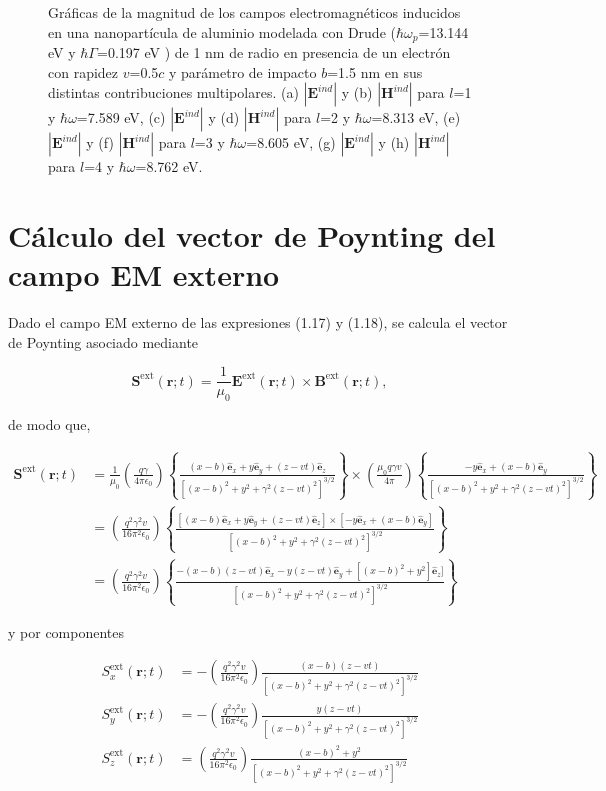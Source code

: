 \documentclass[a4paper,10pt]{article}
\newcommand{\hatbf}[1] {\hat{\mathbf{#1}}}	%
\begin{document}
\begin{figure}[htb!]
\begin{subfigure}[b]{0.5\textwidth}
\caption{}
\end{subfigure}
\caption{Gráficas de la magnitud de los campos electromagnéticos inducidos en una nanopartícula de aluminio modelada con Drude ($\hbar\omega_p$=13.144 eV y $\hbar\Gamma$=0.197 eV ) de 1 nm de radio en presencia de un electrón con rapidez $v$=0.5$c$ y parámetro de impacto $b$=1.5 nm en sus distintas contribuciones multipolares. (a) $|\textbf{E}^{ind}|$ y (b) $|\textbf{H}^{ind}|$ para $l$=1 y $\hbar\omega$=7.589 eV, (c) $|\textbf{E}^{ind}|$ y (d) $|\textbf{H}^{ind}|$ para $l$=2 y $\hbar\omega$=8.313 eV, (e) $|\textbf{E}^{ind}|$ y (f) $|\textbf{H}^{ind}|$ para $l$=3 y $\hbar\omega$=8.605 eV, (g) $|\textbf{E}^{ind}|$ y (h) $|\textbf{H}^{ind}|$ para $l$=4 y $\hbar\omega$=8.762 eV.}
\end{figure}

\section{\large{Cálculo del vector de Poynting del campo EM externo}}

Dado el campo EM externo de las expresiones (1.17) y (1.18), se calcula el vector de Poynting asociado mediante

\begin{equation}
\mathbf{S}^{\text{ext}}(\mathbf{r};t)=\frac{1}{\mu_0}\mathbf{E}^{\text{ext}}(\mathbf{r};t)\times\mathbf{B}^{\text{ext}}(\mathbf{r};t),
\end{equation}

de modo que,

\begin{align}
\mathbf{S}^{\text{ext}}(\mathbf{r};t)
&=\frac{1}{\mu_0}\left(\frac{q\gamma}{4\pi\epsilon_0}\right)\left\{\frac{(x-b)\hatbf{e}_x+y\hatbf{e}_y+(z-vt)\hatbf{e}_z}{[(x-b)^2+y^2+\gamma^2(z-vt)^2]^{3/2}}\right\}\times\left(\frac{\mu_0 q\gamma v}{4\pi}\right)\left\{\frac{-y\hatbf{e}_x+(x-b)\hatbf{e}_y}{[(x-b)^2+y^2+\gamma^2(z-vt)^2]^{3/2}}\right\} \\
&=\left(\frac{q^2\gamma^2 v}{16\pi^2 \epsilon_0}\right)\left\{\frac{[(x-b)\hatbf{e}_x+y\hatbf{e}_y+(z-vt)\hatbf{e}_z]\times[-y\hatbf{e}_x+(x-b)\hatbf{e}_y]}{[(x-b)^2+y^2+\gamma^2(z-vt)^2]^{3/2}}\right\}\\
&=\left(\frac{q^2\gamma^2 v}{16\pi^2 \epsilon_0}\right)\left\{\frac{-(x-b)(z-vt)\hatbf{e}_x-y(z-vt)\hatbf{e}_y+[(x-b)^2+y^2]\hatbf{e}_z]}{[(x-b)^2+y^2+\gamma^2(z-vt)^2]^{3/2}}\right\}
\end{align}

y por componentes

\begin{align}
S^{\text{ext}}_x(\mathbf{r};t)&=-\left(\frac{q^2\gamma^2 v}{16\pi^2 \epsilon_0}\right)\frac{(x-b)(z-vt)}{[(x-b)^2+y^2+\gamma^2(z-vt)^2]^{3/2}}\\
S^{\text{ext}}_y(\mathbf{r};t)&=-\left(\frac{q^2\gamma^2 v}{16\pi^2 \epsilon_0}\right)\frac{y(z-vt)}{[(x-b)^2+y^2+\gamma^2(z-vt)^2]^{3/2}}\\
S^{\text{ext}}_z(\mathbf{r};t)&=\left(\frac{q^2\gamma^2 v}{16\pi^2 \epsilon_0}\right)\frac{(x-b)^2+y^2}{[(x-b)^2+y^2+\gamma^2(z-vt)^2]^{3/2}}
\end{align}
\end{document}
